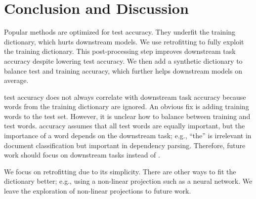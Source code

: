 \section{Conclusion and Discussion}

Popular  methods are optimized for  test accuracy.
They underfit the training dictionary, which hurts downstream models.
We use retrofitting to fully exploit the training dictionary.
This post-processing step improves downstream task accuracy despite lowering
 test accuracy.
We then add a synthetic dictionary to balance  test and training
accuracy, which further helps downstream models on average.

 test accuracy does not always correlate with downstream task
accuracy because words from the training dictionary are ignored.
An obvious fix is adding training words to the  test set.
However, it is unclear how to balance between training and test words.
 accuracy assumes that all test words are equally important,
but the importance of a word depends on the downstream task; e.g., ``the'' is
irrelevant in document classification but important in dependency parsing.
Therefore, future work should focus on downstream tasks instead of .

We focus on retrofitting due to its simplicity.
There are other ways to fit the dictionary better; e.g., using a non-linear
projection such as a neural network.
We leave the exploration of non-linear projections to future work.
